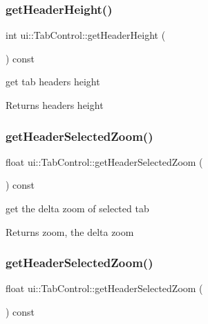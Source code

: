\subsubsection{\texorpdfstring{get\+Header\+Height()}{getHeaderHeight()}\hspace{0.1cm}{\footnotesize\ttfamily [2/2]}}
{\footnotesize\ttfamily int ui\+::\+Tab\+Control\+::get\+Header\+Height (\begin{DoxyParamCaption}{ }\end{DoxyParamCaption}) const\hspace{0.3cm}{\ttfamily [inline]}}

get tab header\textquotesingle{}s height \begin{DoxyReturn}{Returns}
header\textquotesingle{}s height 
\end{DoxyReturn}
\mbox{\label{classui_1_1TabControl_a0b4d2d945e28d89fb7f071f46b161636}} 
\subsubsection{\texorpdfstring{get\+Header\+Selected\+Zoom()}{getHeaderSelectedZoom()}\hspace{0.1cm}{\footnotesize\ttfamily [1/2]}}
{\footnotesize\ttfamily float ui\+::\+Tab\+Control\+::get\+Header\+Selected\+Zoom (\begin{DoxyParamCaption}{ }\end{DoxyParamCaption}) const\hspace{0.3cm}{\ttfamily [inline]}}

get the delta zoom of selected tab \begin{DoxyReturn}{Returns}
zoom, the delta zoom 
\end{DoxyReturn}
\mbox{\label{classui_1_1TabControl_a0b4d2d945e28d89fb7f071f46b161636}} 
\subsubsection{\texorpdfstring{get\+Header\+Selected\+Zoom()}{getHeaderSelectedZoom()}\hspace{0.1cm}{\footnotesize\ttfamily [2/2]}}
{\footnotesize\ttfamily float ui\+::\+Tab\+Control\+::get\+Header\+Selected\+Zoom (\begin{DoxyParamCaption}{ }\end{DoxyParamCaption}) const\hspace{0.3cm}{\ttfamily [inline]}}


